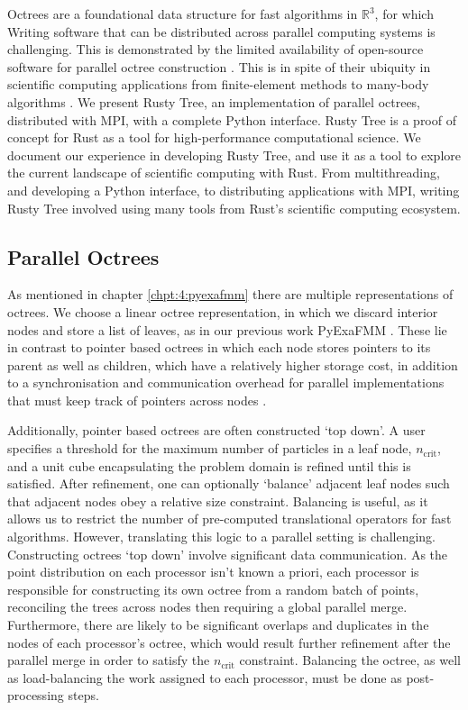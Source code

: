 Octrees are a foundational data structure for fast algorithms in $\mathbb{R}^3$, for which Writing software that can be distributed across parallel computing systems is challenging. This is demonstrated by the limited availability of open-source software for parallel octree construction \cite{BursteddeWilcoxGhattas11,fernando2020github}. This is in spite of their ubiquity in scientific computing applications from finite-element methods to many-body algorithms \cite{sundar2008bottom}. We present Rusty Tree, an implementation of parallel octrees, distributed with MPI, with a complete Python interface. Rusty Tree is a proof of concept for Rust as a tool for high-performance computational science. We document our experience in developing Rusty Tree, and use it as a tool to explore the current landscape of scientific computing with Rust. From multithreading, and developing a Python interface, to distributing applications with MPI, writing Rusty Tree involved using many tools from Rust's scientific computing ecosystem. 

\subsection*{Parallel Octrees}

As mentioned in chapter \ref{chpt:4:pyexafmm} there are multiple representations of octrees. We choose a linear octree representation, in which we discard interior nodes and store a list of leaves, as in our previous work PyExaFMM \cite{kailasa2022pyexafmm}. These lie in contrast to pointer based octrees in which each node stores pointers to its parent as well as children, which have a relatively higher storage cost, in addition to a synchronisation and communication overhead for parallel implementations that must keep track of pointers across nodes \cite{tu2005scalable}. 

Additionally, pointer based octrees are often constructed `top down'. A user specifies a threshold for the maximum number of particles in a leaf node, $n_{\text{crit}}$, and a unit cube encapsulating the problem domain is refined until this is satisfied. After refinement, one can optionally `balance' adjacent leaf nodes such that adjacent nodes obey a relative size constraint. Balancing is useful, as it allows us to restrict the number of pre-computed translational operators for fast algorithms. However, translating this logic to a parallel setting is challenging. Constructing octrees `top down' involve significant data communication. As the point distribution on each processor isn't known a priori, each processor is responsible for constructing its own octree from a random batch of points, reconciling the trees across nodes then requiring a global parallel merge. Furthermore, there are likely to be significant overlaps and duplicates in the nodes of each processor's octree, which would result further refinement after the parallel merge in order to satisfy the $n_{\text{crit}}$ constraint. Balancing the octree, as well as load-balancing the work assigned to each processor, must be done as post-processing steps.

